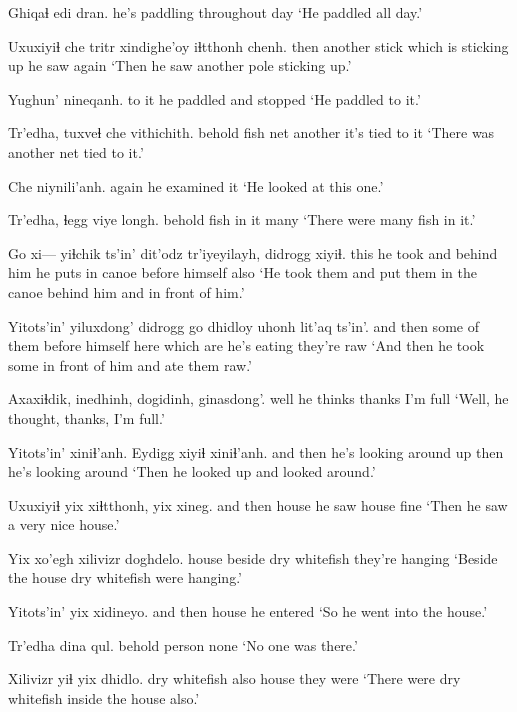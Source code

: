 \documentclass[12pt]{article}
\begin{document}
\gll Ghiqaɬ  edi dran.
{he's paddling} throughout day
\glt `He paddled all day.'
\glend

\gll Uxuxiyiɬ che  tritr xindighe'oy iɬtthonh chenh.
then  another  stick {which is sticking up}  {he saw}  again
\glt `Then he saw another pole sticking up.'
\glend

\gll Yughun' nineqanh.
{to it}  {he paddled and stopped}
\glt `He paddled to it.'
\glend

\gll Tr'edha, tuxveɬ che  vithichith.
behold {fish net}  another  {it's tied to it}
\glt `There was another net tied to it.'
\glend

\gll Che niynili'anh.
again {he examined it}
\glt `He looked at this one.'
\glend

\gll Tr'edha, ɬegg viye longh.
behold  fish {in it} many
\glt `There were many fish in it.'
\glend

\gll Go xi--- yiɬchik  ts'in' dit'odz  tr'iyeyilayh, didrogg xiyiɬ.
this {} {he took}  and {behind him} {he puts in canoe} {before himself} also
\glt `He took them and put them in the canoe behind him and in front of him.'
\glend

\gll Yitots'in' yiluxdong' didrogg go dhidloy uhonh lit'aq ts'in'.
{and then} {some of them} {before himself} here {which are} {he's eating} {they're raw}
\glt `And then he took some in front of him and ate them raw.'
\glend

\gll Axaxiɬdik, inedhinh, dogidinh,  ginasdong'.
well  {he thinks} thanks   {I'm full}
\glt `Well, he thought, thanks, I'm full.'
\glend

\gll Yitots'in' xiniɬ'anh. Eydigg xiyiɬ xiniɬ'anh.
{and then} {he's looking around} up then {he's looking around}
\glt `Then he looked up and looked around.'
\glend

\gll Uxuxiyiɬ yix xiɬtthonh, yix xineg.
{and then} house {he saw}  house fine
\glt `Then he saw a very nice house.'
\glend

\gll Yix xo'egh xilivizr doghdelo.
house beside  {dry whitefish} {they're hanging}
\glt `Beside the house dry whitefish were hanging.'
\glend

\gll Yitots'in' yix xidineyo.
{and then} house {he entered}
\glt `So he went into the house.'
\glend

\gll Tr'edha dina  qul.
behold  person  none
\glt `No one was there.'
\glend

\gll Xilivizr yiɬ yix  dhidlo.
{dry whitefish} also house {they were}
\glt `There were dry whitefish inside the house also.'
\glend
\end{document}
